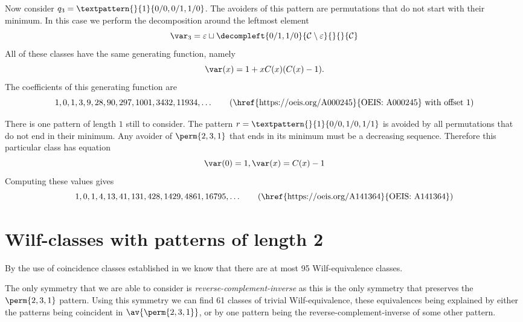 Now consider \(q_3 = \textpattern{}{1}{0/0,0/1,1/0}\). The avoiders of this
pattern are permutations that do not start with their minimum. In this case we
perform the decomposition around the leftmost element
\begin{equation*}
    \mathcal{\var}_3 =\varepsilon \sqcup
\decompleft{0/1,1/0}{\mathcal{C}\setminus\varepsilon}{}{}{\mathcal{C}}
\end{equation*}
All of these classes have the same generating function, namely
\begin{equation}
    \var(x) = 1 + xC(x)(C(x)-1). \label{eqn:maxlgen}
\end{equation}
The coefficients of this generating function are
\begin{equation*}
    1, 0, 1, 3, 9, 28, 90, 297, 1001, 3432, 11934,\dotsc
\tag{\href{https://oeis.org/A000245}{OEIS: A000245} with offset \(1\)}
\end{equation*}

\nextvar[\varmaxl]
There is one pattern of length \(1\) still to consider. The pattern
\(r = \textpattern{}{1}{0/0,1/0,1/1}\) is avoided by all permutations
that do not end in their minimum. Any avoider of \(\perm{2,3,1}\) that
ends in its minimum must be a decreasing sequence.
Therefore this particular class has equation
\begin{equation*}
    \var(0) = 1, \var(x) = C(x)-1
\end{equation*}
Computing these values gives
\begin{equation*}
    	1, 0, 1, 4, 13, 41, 131, 428, 1429, 4861, 16795,\dotsc
\tag{\href{https://oeis.org/A141364}{OEIS: A141364}}
\end{equation*}

\section{Wilf-classes with patterns of length 2}
By the use of coincidence classes established in
 we know that there are at most 95 Wilf-equivalence classes.

The only symmetry that we are able to consider is \emph{reverse-complement-inverse} as this is the only symmetry that preserves the
\(\perm{2,3,1}\) pattern. Using this symmetry we can find 61 classes of trivial
Wilf-equivalence, these equivalences being explained by either the patterns being
coincident in \(\av{\perm{2,3,1}}\), or by one pattern being the reverse-complement-inverse of some other pattern.


